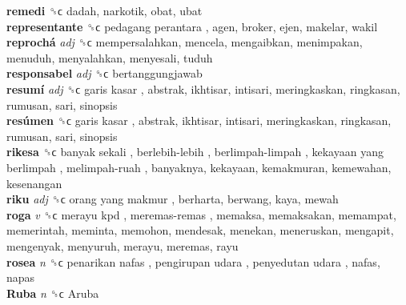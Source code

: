 \textbf{remedi} ␝ϲ  dadah, narkotik, obat, ubat  \\
\textbf{representante} ␝ϲ   pedagang perantara , agen, broker, ejen, makelar, wakil  \\
\textbf{reprochá} \emph{adj}  ␝ϲ  mempersalahkan, mencela, mengaibkan, menimpakan, menuduh, menyalahkan, menyesali, tuduh  \\
\textbf{responsabel} \emph{adj}  ␝ϲ  bertanggungjawab  \\
\textbf{resumí} \emph{adj}  ␝ϲ   garis kasar , abstrak, ikhtisar, intisari, meringkaskan, ringkasan, rumusan, sari, sinopsis  \\
\textbf{resúmen} ␝ϲ   garis kasar , abstrak, ikhtisar, intisari, meringkaskan, ringkasan, rumusan, sari, sinopsis  \\
\textbf{rikesa} ␝ϲ   banyak sekali ,  berlebih-lebih ,  berlimpah-limpah ,  kekayaan yang berlimpah ,  melimpah-ruah , banyaknya, kekayaan, kemakmuran, kemewahan, kesenangan  \\
\textbf{riku} \emph{adj}  ␝ϲ   orang yang makmur , berharta, berwang, kaya, mewah  \\
\textbf{roga} \emph{v}  ␝ϲ   merayu kpd ,  meremas-remas , memaksa, memaksakan, memampat, memerintah, meminta, memohon, mendesak, menekan, meneruskan, mengapit, mengenyak, menyuruh, merayu, meremas, rayu  \\
\textbf{rosea} \emph{n}  ␝ϲ   penarikan nafas ,  pengirupan udara ,  penyedutan udara , nafas, napas  \\
\textbf{Ruba} \emph{n}  ␝ϲ   Aruba   \\
